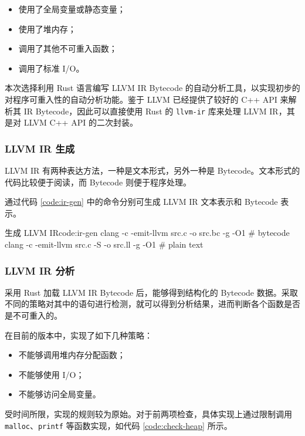 \documentclass[a4paper, 12pt]{article} %
\newcounter{code}
\numberwithin{equation}{section}
\begin{document}
\begin{itemize}
  \item 使用了全局变量或静态变量；
  \item 使用了堆内存；
  \item 调用了其他不可重入函数；
  \item 调用了标准 I/O。
\end{itemize}

本次选择利用 Rust 语言编写 LLVM IR Bytecode 的自动分析工具，以实现初步的对程序可重入性的自动分析功能。鉴于 LLVM 已经提供了较好的 C++ API 来解析其 IR Bytecode，因此可以直接使用 Rust 的 \texttt{llvm-ir} 库来处理 LLVM IR，其是对 LLVM C++ API 的二次封装。

\subsubsection{LLVM IR 生成}

LLVM IR 有两种表达方法，一种是文本形式，另外一种是 Bytecode。文本形式的代码比较便于阅读，而 Bytecode 则便于程序处理。

通过代码 \ref{code:ir-gen} 中的命令分别可生成 LLVM IR 文本表示和 Bytecode 表示。

\begin{code}[sh]{生成 LLVM IR}{code:ir-gen}
  clang -c -emit-llvm src.c -o src.bc -g -O1  # bytecode
  clang -c -emit-llvm src.c -S -o src.ll -g -O1 # plain text
\end{code}

\subsubsection{LLVM IR 分析}

采用 Rust 加载 LLVM IR Bytecode 后，能够得到结构化的 Bytecode 数据。采取不同的策略对其中的语句进行检测，就可以得到分析结果，进而判断各个函数是否是不可重入的。

在目前的版本中，实现了如下几种策略：

\begin{itemize}
  \item 不能够调用堆内存分配函数；
  \item 不能够使用 I/O；
  \item 不能够访问全局变量。
\end{itemize}

受时间所限，实现的规则较为原始。对于前两项检查，具体实现上通过限制调用 \texttt{malloc}、\texttt{printf} 等函数实现，如代码 \ref{code:check-heap} 所示。
\end{document}
